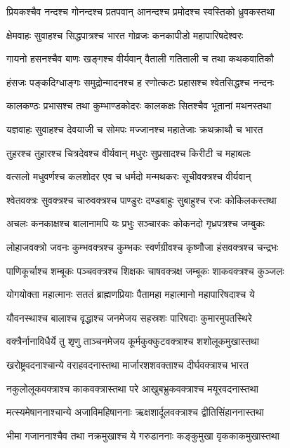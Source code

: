 \twolineshloka
{प्रियकश्चैव नन्दश्च गोनन्दश्च प्रतपवान्}
{आनन्दश्च प्रमोदश्च स्वस्तिको ध्रुवकस्तथा}


\twolineshloka
{क्षेमवाहः सुवाहश्च सिद्धपात्रश्च भारत}
{गोव्रजः कनकापीडो महापारिषदेश्वरः}


\twolineshloka
{गायनो हसनश्चैव बाणः खङ्गश्च वीर्यवान्}
{वैताली गतिताली च तथा कथकवातिकौ}


\twolineshloka
{हंसजः पङ्कदिग्धाङ्गः समुद्रोन्मादनश्च ह}
{रणोत्कटः प्रहासश्च श्वेतसिद्धश्च नन्दनः}


\twolineshloka
{कालकण्ठः प्रभासश्च तथा कुम्भाण्डकोदरः}
{कालकक्षः सितश्चैव भूतानां मथनस्तथा}


\twolineshloka
{यज्ञवाहः सुवाहश्च देवयाजी च सोमपः}
{मज्जानश्च महातेजाः क्रथक्राथौ च भारत}


\twolineshloka
{तुहरश्च तुहारश्च चित्रदेवश्च वीर्यवान्}
{मधुरः सुप्रसादश्च किरीटी च महाबलः}


\twolineshloka
{वत्सलो मधुवर्णश्च कलशोदर एव च}
{धर्मदो मन्मथकरः सूचीवक्त्रश्च वीर्यवान्}


\twolineshloka
{श्वेतवक्त्रः सुवक्त्रश्च चारुवक्त्रश्च पाण्डुरः}
{दण्डबाहुः सुबाहुश्च रजः कोकिलकस्तथा}


\twolineshloka
{अचलः कनकाक्षश्च बालानामपि यः प्रभुः}
{सञ्चारकः कोकनदो गृध्रपत्रश्च जम्बुकः}


\twolineshloka
{लोहाजवक्त्रो जवनः कुम्भवक्त्रश्च कुम्भकः}
{स्वर्णग्रीवश्च कृष्णौजा हंसवक्त्रश्च चन्द्रभः}


\twolineshloka
{पाणिकूर्चाश्च शम्बूकः पञ्चवक्त्रश्च शिक्षकः}
{चाषवक्त्रक्ष जम्बूकः शाकवक्त्रश्च कुञ्जलः}


\twolineshloka
{योगयोक्ता महात्मानः सततं ब्राह्मणप्रियाः}
{पैतामहा महात्मानो महापारिषदाश्च ये}


\twolineshloka
{यौवनस्थाश्च बालाश्च वृद्धाश्च जनमेजय}
{सहस्रशः पारिषदाः कुमारमुपतस्थिरे}


\twolineshloka
{वक्त्रैर्नानाविधैर्ये तु शृणु ताञ्चनमेजय}
{कूर्मकुक्कुटवक्त्राश्च शशोलूकमुखास्तथा}


\twolineshloka
{खरोष्ट्रवदनाश्चान्ये वराहवदनास्तथा}
{मार्जारशशवक्ताश्च दीर्घवक्त्राश्च भारत}


\twolineshloka
{नकुलोलूकवक्त्राश्च काकवक्त्रास्तथा परे}
{आखुबभ्रुकवक्त्राश्च मयूरवदनास्तथा}


\twolineshloka
{मत्स्यमेषाननाश्चान्ये अजाविमहिषाननाः}
{ऋक्षशार्दूलवक्त्राश्च द्वीतिसिंहाननास्तथा}


\twolineshloka
{भीमा गजाननाश्चैव तथा नक्रमुखाश्च ये}
{गरुडाननाः कङ्कुमुखा वृककाकमुखास्तथा}


